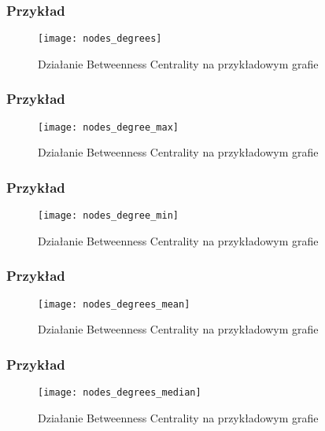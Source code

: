 \FloatBarrier
\subsubsection{Przykład}
\begin{figure}[h]
	\centering
	\texttt{[image: nodes\_degrees]}
	\caption{Działanie Betweenness Centrality  na przykładowym grafie}
\end{figure}
\FloatBarrier\FloatBarrier
\subsubsection{Przykład}
\begin{figure}[h]
	\centering
	\texttt{[image: nodes\_degree\_max]}
	\caption{Działanie Betweenness Centrality  na przykładowym grafie}
\end{figure}
\FloatBarrier\FloatBarrier
\subsubsection{Przykład}
\begin{figure}[h]
	\centering
	\texttt{[image: nodes\_degree\_min]}
	\caption{Działanie Betweenness Centrality  na przykładowym grafie}
\end{figure}
\FloatBarrier\FloatBarrier
\subsubsection{Przykład}
\begin{figure}[h]
	\centering
	\texttt{[image: nodes\_degrees\_mean]}
	\caption{Działanie Betweenness Centrality  na przykładowym grafie}
\end{figure}
\FloatBarrier\FloatBarrier
\subsubsection{Przykład}
\begin{figure}[h]
	\centering
	\texttt{[image: nodes\_degrees\_median]}
	\caption{Działanie Betweenness Centrality  na przykładowym grafie}
\end{figure}
\FloatBarrier\FloatBarrier